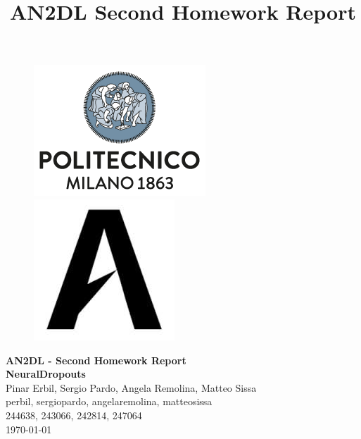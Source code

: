 \documentclass[11pt]{article}
\title{AN2DL Second Homework Report}
\begin{document}
    
    \begin{figure}[H]
        \raggedright
        \includegraphics[scale=0.4]{polimi.png} \hfill \includegraphics[scale=0.3]{airlab.jpeg}
    \end{figure}
    
    \vspace{5mm}
    
    \begin{center}
        {\Large \textbf{AN2DL - Second Homework Report}}\\
        \vspace{2mm}
        {\Large \textbf{NeuralDropouts}}\\
        \vspace{2mm}
        {\large Pinar Erbil,}
        {\large Sergio Pardo,}
        {\large Angela Remolina,}
        {\large Matteo Sissa}\\
        \vspace{2mm}
        {perbil,}
        {sergiopardo,}
        {angelaremolina,}
        {matteosissa}\\
        \vspace{2mm}
        {244638,}
        {243066,}
        {242814,}
        {247064}\\
        \vspace{5mm}
        \today
    \end{center}    
    \vspace{5mm}
    
\end{document}
